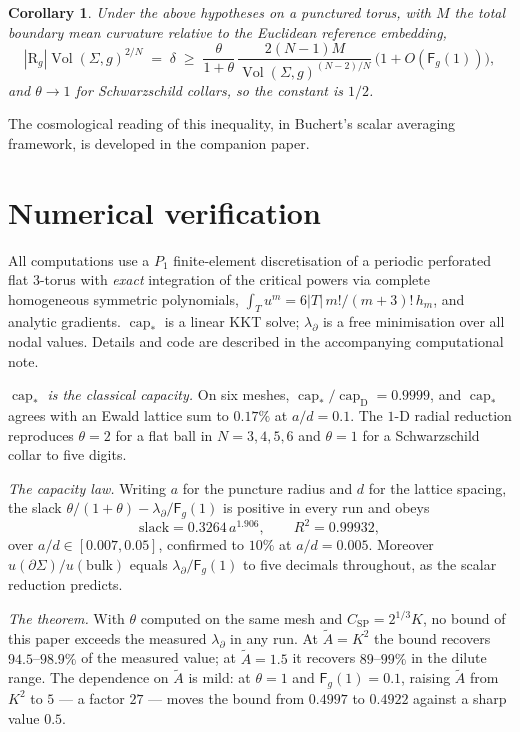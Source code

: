 \documentclass[11pt,reqno]{amsart}
\theoremstyle{plain}
\newtheorem{corollary}[theorem]{Corollary}
\theoremstyle{definition}
\newcommand{\Vol}{\operatorname{Vol}}
\newcommand{\cpstar}{\operatorname{cap}_{*}}
\newcommand{\Fq}{\mathsf{F}}
\newcommand{\Ksob}{K}
\newcommand{\Csp}{C_{\mathrm{SP}}}
\newcommand{\Atil}{\widetilde{A}}
\begin{document}
\begin{corollary}
\label{cor:yamabe}
Under the above hypotheses on a punctured torus, with $M$ the total boundary
mean curvature relative to the Euclidean reference embedding,
\[
  |\mathrm{R}_g|\Vol(\Sigma,g)^{2/N}\;=\;\delta\;\ge\;
  \frac{\theta}{1+\theta}\,\frac{2(N-1)M}{\Vol(\Sigma,g)^{(N-2)/N}}\,
  \bigl(1+O(\Fq_g(1))\bigr),
\]
and $\theta\to1$ for Schwarzschild collars, so the constant is $1/2$.
\end{corollary}

The cosmological reading of this inequality, in Buchert's scalar averaging
framework, is developed in the companion paper.

\section{Numerical verification}
\label{sec:numerics}

All computations use a $P_1$ finite-element discretisation of a periodic
perforated flat $3$-torus with \emph{exact} integration of the critical powers via
complete homogeneous symmetric polynomials, $\int_Tu^m=6|T|\,m!/(m+3)!\,h_m$, and
analytic gradients. $\cpstar$ is a linear KKT solve; $\lambda_\partial$ is a free
minimisation over all nodal values. Details and code are described in the
accompanying computational note.

\emph{$\cpstar$ is the classical capacity.} On six meshes,
$\cpstar/\operatorname{cap}_{\mathrm D}=0.9999$, and $\cpstar$ agrees with an
Ewald lattice sum to $0.17\%$ at $a/d=0.1$. The $1$-D radial reduction reproduces
$\theta=2$ for a flat ball in $N=3,4,5,6$ and $\theta=1$ for a Schwarzschild
collar to five digits.

\emph{The capacity law.} Writing $a$ for the puncture radius and $d$ for the
lattice spacing, the slack $\theta/(1+\theta)-\lambda_\partial/\Fq_g(1)$ is
positive in every run and obeys
\[
  \text{slack}=0.3264\,a^{1.906},\qquad R^2=0.99932,
\]
over $a/d\in[0.007,0.05]$, confirmed to $10\%$ at $a/d=0.005$. Moreover
$u(\partial\Sigma)/u(\text{bulk})$ equals $\lambda_\partial/\Fq_g(1)$ to five
decimals throughout, as the scalar reduction predicts.

\emph{The theorem.} With $\theta$ computed on the same mesh and
$\Csp=2^{1/3}\Ksob$, no bound of this paper exceeds the measured
$\lambda_\partial$ in any run. At $\Atil=\Ksob^2$ the bound recovers
$94.5$--$98.9\%$ of the measured value; at $\Atil=1.5$ it recovers
$89$--$99\%$ in the dilute range. The dependence on $\Atil$ is mild: at
$\theta=1$ and $\Fq_g(1)=0.1$, raising $\Atil$ from $\Ksob^2$ to $5$ — a factor
$27$ — moves the bound from $0.4997$ to $0.4922$ against a sharp value $0.5$.
\end{document}
